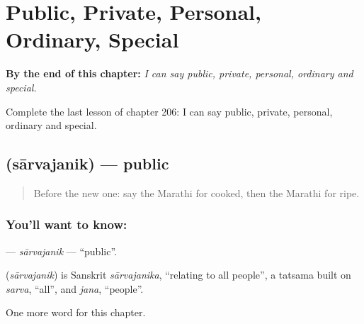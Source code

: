 
\chapter{Public, Private, Personal, Ordinary, Special}
\label{ch:mr-public-private-personal-ordinary-special}

\begin{chapteropening}
\textbf{By the end of this chapter:} \emph{I can say public, private, personal, ordinary and special.}

Complete the last lesson of chapter 206: I can say public, private, personal, ordinary and special.
\end{chapteropening}

\section[\texorpdfstring{\mr{सार्वजनिक} (sārvajanik)}{सार्वजनिक (sārvajanik)}]{ (sārvajanik) — public}

\label{lesson:MR-C206-sarvajanik}



\begin{quote}
Before the new one: say the Marathi for cooked, then the Marathi for ripe.
\end{quote}

\subsection*{You'll want to know: }
\textbf{} — \emph{sārvajanik} — \textquotedblleft{}public\textquotedblright{}.

\begin{cousinweb}
\textbf{} (\emph{sārvajanik}) is Sanskrit \emph{sārvajanika}, \textquotedblleft{}relating to all people\textquotedblright{}, a tatsama built on \emph{sarva}, \textquotedblleft{}all\textquotedblright{}, and \emph{jana}, \textquotedblleft{}people\textquotedblright{}.
\end{cousinweb}

\begin{grammarlens}[title={What you've built}]
One more word for this chapter.
\end{grammarlens}

